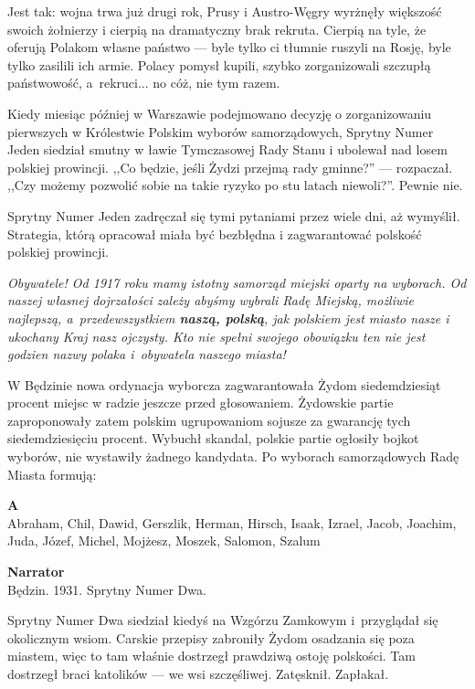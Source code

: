 \documentclass[11pt,a4paper,oneside]{article}
\begin{document}
Jest tak: wojna trwa już drugi rok, Prusy i Austro-Węgry wyrżnęły
większość swoich żołnierzy i cierpią na dramatyczny brak rekruta.
Cierpią na tyle, że oferują Polakom własne państwo --- byle tylko ci
tłumnie ruszyli na Rosję, byle tylko zasilili ich armie. Polacy pomysł
kupili, szybko zorganizowali szczupłą państwowość, a~rekruci... no
cóż, nie tym razem.

Kiedy miesiąc później w Warszawie podejmowano decyzję o zorganizowaniu
pierwszych w Królestwie Polskim wyborów samorządowych, Sprytny Numer
Jeden siedział smutny w ławie Tymczasowej Rady Stanu i ubolewał nad
losem polskiej prowincji. ,,Co będzie, jeśli Żydzi przejmą rady
gminne?'' --- rozpaczał.  ,,Czy możemy pozwolić sobie na takie ryzyko
po stu latach niewoli?''. Pewnie nie.

Sprytny Numer Jeden zadręczał się tymi pytaniami przez wiele dni, aż
wymyślił.  Strategia, którą opracował miała być bezbłędna
i zagwarantować polskość polskiej prowincji. 

\emph{Obywatele! Od 1917 roku mamy istotny samorząd miejski oparty na
wyborach. Od naszej własnej dojrzałości zależy abyśmy wybrali Radę
Miejską, możliwie najlepszą, a~przedewszystkiem \textbf{naszą,
polską}, jak polskiem jest miasto nasze i ukochany Kraj nasz ojczysty.
Kto nie spełni swojego obowiązku ten nie jest godzien nazwy polaka
i~obywatela naszego miasta!}

W Będzinie nowa ordynacja wyborcza zagwarantowała Żydom siedemdziesiąt
procent miejsc w radzie jeszcze przed głosowaniem. Żydowskie partie %
zaproponowały zatem polskim ugrupowaniom sojusze za gwarancję tych
siedemdziesięciu procent. Wybuchł skandal, polskie partie ogłosiły
bojkot wyborów, nie wystawiły żadnego kandydata. Po wyborach 
samorządowych Radę Miasta formują:

\textbf{A}\\
Abraham, Chil, Dawid, Gerszlik, Herman, Hirsch, Isaak, Izrael, Jacob,
Joachim, Juda, Józef, Michel, Mojżesz, Moszek, Salomon, Szalum


\textbf{Narrator}\\
Będzin. 1931. Sprytny Numer Dwa. 

Sprytny Numer Dwa siedział kiedyś na Wzgórzu Zamkowym i~przyglądał się
okolicznym wsiom. Carskie przepisy zabroniły Żydom osadzania się poza
miastem, więc to tam właśnie dostrzegł prawdziwą ostoję polskości. Tam
dostrzegł braci katolików --- we wsi szczęśliwej.  Zatęsknił.
Zapłakał.
\end{document}
